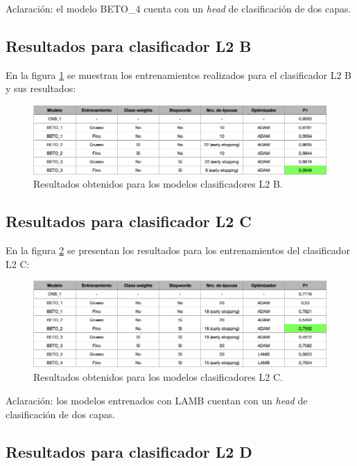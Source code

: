 Aclaración: el modelo BETO\_4 cuenta con un \textit{head} de clasificación de dos capas.

\subsection{Resultados para clasificador L2 B}

En la figura \ref{fig:res-l2b} se muestran los entrenamientos realizados para el clasificador L2 B y sus resultados:

\begin{figure}[htbp]
	\centering
	\includegraphics[width=1\textwidth]{./Figures/cap4-resultados-l2b.png}
	\caption{Resultados obtenidos para los modelos clasificadores L2 B.}
	\label{fig:res-l2b}
\end{figure}

\subsection{Resultados para clasificador L2 C}

En la figura \ref{fig:res-l2c} se presentan los resultados para los entrenamientos del clasificador L2 C:

\begin{figure}[htbp]
	\centering
	\includegraphics[width=1\textwidth]{./Figures/cap4-resultados-l2c.png}
	\caption{Resultados obtenidos para los modelos clasificadores L2 C.}
	\label{fig:res-l2c}
\end{figure}

Aclaración: los modelos entrenados con LAMB cuentan con un \textit{head} de clasificación de dos capas.

\subsection{Resultados para clasificador L2 D}

